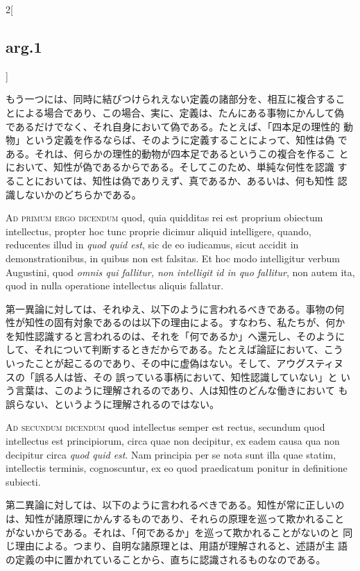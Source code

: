 \documentclass[paper=a4paper,fontsize=10pt,jafontsize=9pt,titlepage]{jlreq}
\begin{document}
\begin{paracol}{2}[\subsection{arg.1}]
\switchcolumn

もう一つには、同時に結びつけられえない定義の諸部分を、相互に複合するこ
とによる場合であり、この場合、実に、定義は、たんにある事物にかんして偽
であるだけでなく、それ自身において偽である。たとえば、「四本足の理性的
動物」という定義を作るならば、そのように定義することによって、知性は偽
である。それは、何らかの理性的動物が四本足であるというこの複合を作るこ
とにおいて、知性が偽であるからである。そしてこのため、単純な何性を認識
することにおいては、知性は偽でありえず、真であるか、あるいは、何も知性
認識しないかのどちらかである。

\switchcolumn*[\subsection{ad.1}]


{\scshape Ad primum ergo dicendum} quod, quia quidditas rei est
proprium obiectum intellectus, propter hoc tunc proprie dicimur
aliquid intelligere, quando, reducentes illud in {\itshape quod quid
est}, sic de eo iudicamus, sicut accidit in demonstrationibus, in
quibus non est falsitas. Et hoc modo intelligitur verbum Augustini,
quod {\itshape omnis qui fallitur, non intelligit id in quo fallitur},
non autem ita, quod in nulla operatione intellectus aliquis fallatur.

\switchcolumn

第一異論に対しては、それゆえ、以下のように言われるべきである。事物の何
性が知性の固有対象であるのは以下の理由による。すなわち、私たちが、何か
を知性認識すると言われるのは、それを「何であるか」へ還元し、そのように
して、それについて判断するときだからである。たとえば論証において、こう
いったことが起こるのであり、その中に虚偽はない。そして、アウグスティヌ
スの「誤る人は皆、その 誤っている事柄において、知性認識していない」と
いう言葉は、このように理解されるのであり、人は知性のどんな働きにおいて
も誤らない、というように理解されるのではない。

\switchcolumn*[\subsection{ad.2}]


{\scshape Ad secundum dicendum} quod intellectus semper est rectus,
secundum quod intellectus est principiorum, circa quae non decipitur,
ex eadem causa qua non decipitur circa {\itshape quod quid est}. Nam
principia per se nota sunt illa quae statim, intellectis terminis,
cognoscuntur, ex eo quod praedicatum ponitur in definitione subiecti.

\switchcolumn

第二異論に対しては、以下のように言われるべきである。知性が常に正しいの
は、知性が諸原理にかんするものであり、それらの原理を巡って欺かれること
がないからである。それは、「何であるか」を巡って欺かれることがないのと
同じ理由による。つまり、自明な諸原理とは、用語が理解されると、述語が主
語の定義の中に置かれていることから、直ちに認識されるものなのである。

\end{paracol}
\newpage
\end{document}
